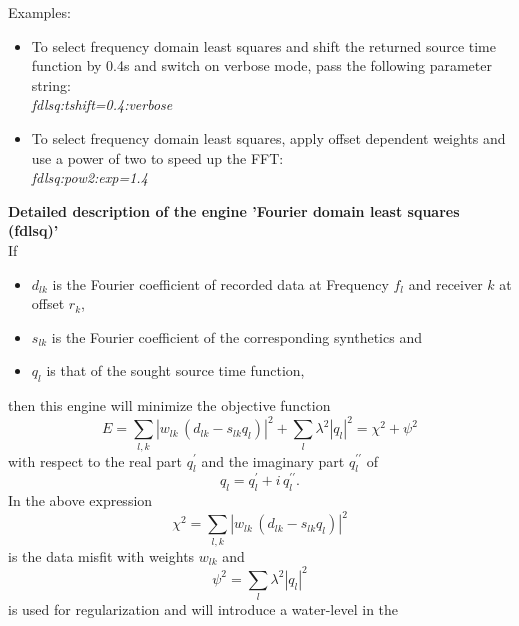 Examples:
\begin{itemize}

        \item To select frequency domain least squares and shift the returned source time function by 0.4s and switch on verbose mode, pass the following parameter string:\\
        \textit{fdlsq:tshift=0.4:verbose} 


        \item To select frequency domain least squares, apply offset dependent weights and use a power of two to speed up the FFT:\\
        \textit{fdlsq:pow2:exp=1.4} 
\end{itemize}
\textbf{Detailed description of the engine 'Fourier domain least squares (fdlsq)'}\\
If
\begin{itemize}
     \item $d_{lk}$ is the Fourier coefficient of recorded data at Frequency
       $f_l$ and receiver $k$ at offset $r_k$,
     \item $s_{lk}$ is the Fourier coefficient of the corresponding
       synthetics and
     \item $q_l$ is that of the sought source time function,
\end{itemize}
then this engine will minimize the objective function\\
     \begin{equation}
       E=\sum\limits_{l,k}\left|w_{lk}\,
          \left(d_{lk}-s_{lk}q_l\right)
       \right|^2+\sum\limits_{l}\lambda^2\left|q_l\right|^2
       =\chi^2+\psi^2
     \end{equation}
     with respect to the real part $q_l^\prime$ and the
     imaginary part $q_l^{\prime\prime}$ of 
     \begin{equation}
       q_l=q_l^\prime+i\,q_l^{\prime\prime}.
     \end{equation}
     In the above expression
     \begin{equation}
       \chi^2=\sum\limits_{l,k}\left|w_{lk}\,
               \left(d_{lk}-s_{lk}q_l\right)
                \right|^2
     \end{equation}
     is the data misfit with weights $w_{lk}$ and
     \begin{equation}
       \psi^2=\sum\limits_{l}\lambda^2\left|q_l\right|^2
     \end{equation}
     is used for regularization and will introduce a water-level in the
